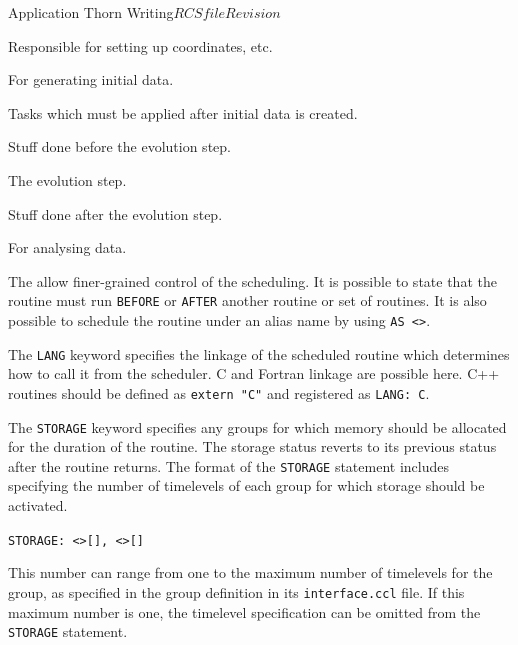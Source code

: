 \begin{cactuspart}{Application Thorn Writing}{$RCSfile$}{$Revision$}
\begin{Lentry}
\item [\texttt{CCTK\_BASEGRID}]
Responsible for setting up coordinates, etc.

\item [\texttt{CCTK\_INITIAL}]
For generating initial data.

\item [\texttt{CCTK\_POSTINITIAL}]
Tasks which must be applied after initial data is created.

\item [\texttt{CCTK\_PRESTEP}]
Stuff done before the evolution step.

\item [\texttt{CCTK\_EVOL}]
The evolution step.

\item [\texttt{CCTK\_POSTSTEP}]
Stuff done after the evolution step.

\item [\texttt{CCTK\_ANALYSIS}]
For analysing data.

\end{Lentry}

The  allow finer-grained control of the scheduling.  It is
possible to state that the routine must run \texttt{BEFORE} or \texttt{AFTER}
another routine or set of routines.
It is also possible to schedule the routine under an
alias name by using \texttt{AS <>}.

\begin{Lentry}

\item[\texttt{LANG}]
The \texttt{LANG} keyword specifies the linkage of the scheduled routine
which determines how to call it from the scheduler.
C and Fortran linkage are possible here. C++ routines should be defined as
\texttt{extern "C"} and registered as \texttt{LANG: C}.

\item[\texttt{STORAGE}] The \texttt{STORAGE} keyword specifies any groups for
which memory should be allocated for the duration of the routine.  The
storage status reverts to its previous status after the routine
returns. The format of the \texttt{STORAGE} statement includes specifying
the number of timelevels of each group for which storage should be activated.

\texttt{STORAGE: <>[],
<>[]}

 This number can range from one to the maximum number of timelevels for the group, as specified in the group definition in its \texttt{interface.ccl} file. If this maximum number is one, the timelevel specification can be omitted from the
\texttt{STORAGE} statement.


\end{Lentry}
\end{cactuspart}
